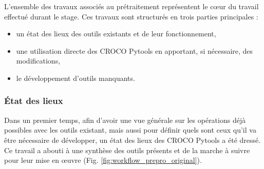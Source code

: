 \documentclass[10pt,a4paper,titlepage]{article}
\begin{document}
L'ensemble des travaux associés au prétraitement représentent le c\oe{}ur du travail effectué durant le stage.
Ces travaux sont structurés en trois parties principales :
\begin{itemize}
    \item un état des lieux des outils existants et de leur fonctionnement,
    \item une utilisation directe des CROCO Pytools en apportant, si nécessaire, des modifications,
    \item le développement d'outils manquants.
\end{itemize}

\subsubsection{État des lieux}
\label{subsub:etat_des_lieux}

Dans un premier temps, afin d'avoir une vue générale sur les opérations déjà possibles avec les outils existant, mais aussi pour définir quels sont ceux qu'il va être nécessaire de développer, un état des lieux des CROCO Pytools a été dressé.
Ce travail a abouti à une synthèse des outils présents et de la marche à suivre pour leur mise en \oe{}uvre (Fig. \ref{fig:workflow_prepro_original}).
\end{document}
